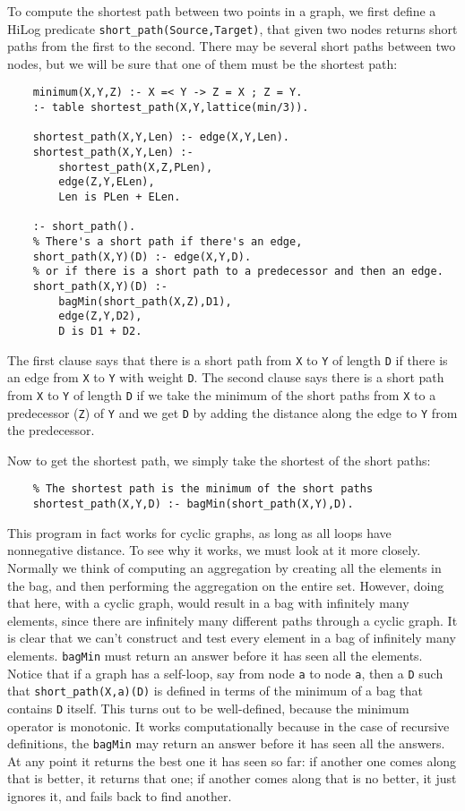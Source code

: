 To compute the shortest path between two points in a graph, we first
define a HiLog predicate \verb|short_path(Source,Target)|, that given
two nodes returns short paths from the first to the second.  There may
be several short paths between two nodes, but we will be sure that one
of them must be the shortest path:
\begin{verbatim}
    minimum(X,Y,Z) :- X =< Y -> Z = X ; Z = Y.
    :- table shortest_path(X,Y,lattice(min/3)).

    shortest_path(X,Y,Len) :- edge(X,Y,Len).
    shortest_path(X,Y,Len) :- 
        shortest_path(X,Z,PLen), 
        edge(Z,Y,ELen), 
        Len is PLen + ELen.

    :- short_path().
    % There's a short path if there's an edge, 
    short_path(X,Y)(D) :- edge(X,Y,D).
    % or if there is a short path to a predecessor and then an edge.
    short_path(X,Y)(D) :-
        bagMin(short_path(X,Z),D1),
        edge(Z,Y,D2),
        D is D1 + D2.
\end{verbatim}
The first clause says that there is a short path from \verb|X| to
\verb|Y| of length \verb|D| if there is an edge from \verb|X| to
\verb|Y| with weight \verb|D|.  The second clause says there is a
short path from \verb|X| to \verb|Y| of length \verb|D| if we take the
minimum of the short paths from \verb|X| to a predecessor (\verb|Z|)
of \verb|Y| and we get \verb|D| by adding the distance along the edge
to \verb|Y| from the predecessor.

Now to get the shortest path, we simply take the shortest of the short
paths:
\begin{verbatim}
    % The shortest path is the minimum of the short paths
    shortest_path(X,Y,D) :- bagMin(short_path(X,Y),D).
\end{verbatim}

This program in fact works for cyclic graphs, as long as all loops
have nonnegative distance.  To see why it works, we must look at it
more closely.  Normally we think of computing an aggregation by
creating all the elements in the bag, and then performing the
aggregation on the entire set.  However, doing that here, with a
cyclic graph, would result in a bag with infinitely many elements,
since there are infinitely many different paths through a cyclic
graph.  It is clear that we can't construct and test every element in
a bag of infinitely many elements.  \verb|bagMin| must return an
answer before it has seen all the elements.  Notice that if a graph
has a self-loop, say from node \verb|a| to node \verb|a|, then a
\verb|D| such that \verb|short_path(X,a)(D)| is defined in terms of
the minimum of a bag that contains \verb|D| itself.  This turns out to
be well-defined, because the minimum operator is monotonic.  It works
computationally because in the case of recursive definitions, the
\verb|bagMin| may return an answer before it has seen all the answers.
At any point it returns the best one it has seen so far: if another
one comes along that is better, it returns that one; if another comes
along that is no better, it just ignores it, and fails back to find
another.

